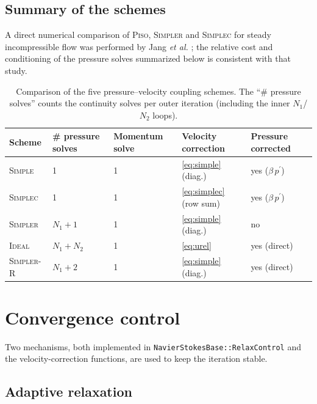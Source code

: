 \documentclass[11pt,a4paper]{article}
\begin{document}
\subsection{Summary of the schemes}
\label{sec:summary}

A direct numerical comparison of \textsc{Piso}, \textsc{Simpler} and
\textsc{Simplec} for steady incompressible flow was performed by Jang \emph{et
al.} \cite{jang1986}; the relative cost and conditioning of the pressure solves
summarized below is consistent with that study.

\begin{table}[h]
\centering
\small
\begin{tabular}{@{}lllll@{}}
\toprule
Scheme & \# pressure solves & Momentum solve & Velocity correction & Pressure corrected\\
\midrule
\textsc{Simple}    & 1 & 1 & \eqref{eq:simple}  (diag.)  & yes ($\beta\,p^{\prime}$)\\
\textsc{Simplec}   & 1 & 1 & \eqref{eq:simplec} (row sum) & yes ($\beta\,p^{\prime}$)\\
\textsc{Simpler}   & $N_{1}+1$ & 1 & \eqref{eq:simple} (diag.) & no\\
\textsc{Ideal}     & $N_{1}+N_{2}$ & 1 & \eqref{eq:urel} & yes (direct)\\
\textsc{Simpler-R} & $N_{1}+2$ & 1 & \eqref{eq:simple} (diag.) & yes (direct)\\
\bottomrule
\end{tabular}
\caption{Comparison of the five pressure--velocity coupling schemes.  The
``\# pressure solves'' counts the continuity solves per outer iteration
(including the inner $N_{1}$/$N_{2}$ loops).}
\label{tab:schemes}
\end{table}

\section{Convergence control}

Two mechanisms, both implemented in
\texttt{NavierStokesBase::RelaxControl} and the velocity-correction
functions, are used to keep the iteration stable.

\subsection{Adaptive relaxation}
\end{document}
